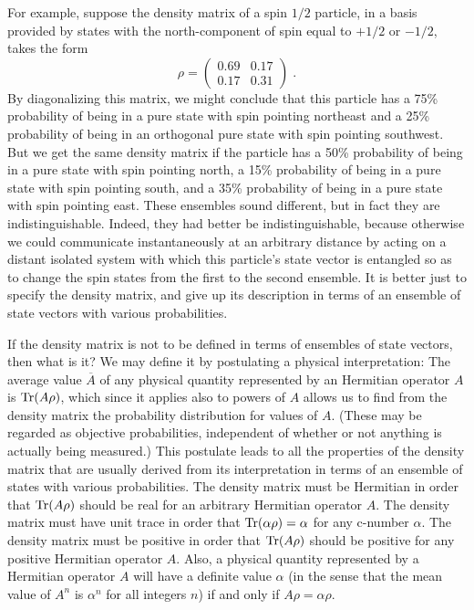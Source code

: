 For example, suppose the density matrix of a spin $1/2$ particle, in a basis provided by states with the north-component of spin equal to $+1/2$ or $-1/2$, takes the form
$$ \rho=\left(\begin{array}{cc} 0.69 & 0.17 \\ 0.17 & 0.31\end{array}\right)\;.$$
By diagonalizing this matrix, we might conclude that 
 this particle has a 75\% probability of being in a pure state with spin pointing northeast and a 25\% probability of being in an orthogonal pure state with spin pointing southwest.  But we get the same density matrix if the particle has a 50\% probability of being in a pure state with spin pointing north, a 15\% probability of being in a pure state with spin pointing south, and a 35\% probability of being in a pure state with spin pointing east.    These ensembles sound different, but in fact they are indistinguishable.  Indeed, they had better be indistinguishable, because otherwise we could communicate instantaneously at an arbitrary distance by acting on a distant isolated system with which this particle's state vector is entangled so as to change the  spin states from the first to the second ensemble.  It is better just to specify the density matrix,
and give up its description in terms of an ensemble of state vectors with various probabilities.



If the density matrix is not to be defined in terms of ensembles of state vectors, then what is it?  We may define it by  postulating a physical interpretation:   The average value $\overline{A}$ of any physical quantity represented by an Hermitian operator $A$ is ${\rm Tr}(A\rho)$, which since it applies also to powers of $A$ allows us to find from the density matrix the probability distribution  for values of $A$.  (These may be regarded as objective probabilities, independent of whether or not anything is actually being measured.)  This postulate leads to all the  properties of the density matrix that are usually derived from its interpretation in terms of an ensemble of states with various probabilities.  The density matrix must be Hermitian in order that ${\rm Tr}(A\rho)$ should be real for an arbitrary Hermitian operator $A$.  The density matrix must have unit trace in order that ${\rm Tr}(\alpha\rho)=\alpha$ for any c-number $\alpha$.  The density matrix must be positive in order that ${\rm Tr}(A\rho)$ should be positive for any positive Hermitian operator $A$.  Also, a physical quantity represented by a Hermitian operator $A$ will have a definite value $\alpha$ (in the sense that the mean value of $A^n$ is $\alpha^n$ for all integers $n$) if and only if $A\rho=\alpha\rho$.  


